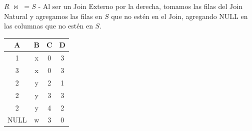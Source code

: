 \item $R$ $\mathrel{\bowtie\!\!}$ $=S$ - Al ser un Join Externo por la derecha, tomamos las filas del Join Natural y agregamos las filas en $S$ que no estén en el Join, agregando NULL en las columnas que no estén en $S$.

\begin{center}
\begin{tabular}{cccc}
\toprule
\textbf{A} & \textbf{B} & \textbf{C} & \textbf{D} \\
\midrule
1 & x & 0 & 3 \\
3 & x & 0 & 3 \\
2 & y & 2 & 1 \\
2 & y & 3 & 3 \\
2 & y & 4 & 2 \\
NULL & w & 3 & 0 \\
\bottomrule
\end{tabular}
\end{center}
